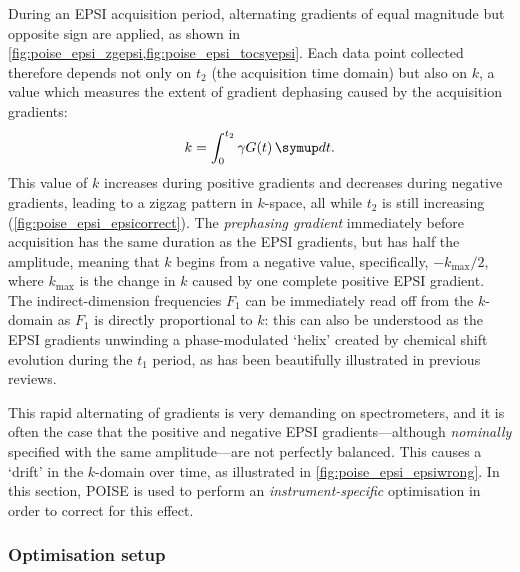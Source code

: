 During an EPSI acquisition period, alternating gradients of equal magnitude but opposite sign are applied, as shown in \cref{fig:poise_epsi_zgepsi,fig:poise_epsi_tocsyepsi}. Each data point collected therefore depends not only on $t_2$ (the acquisition time domain) but also on $k$, a value which measures the extent of gradient dephasing caused by the acquisition gradients:
\begin{equation}
    \label{eq:epsi_k_space}
    k = \int_0^{t_2} \gamma G(t) \,\md t.
\end{equation}
This value of $k$ increases during positive gradients and decreases during negative gradients, leading to a zigzag pattern in $k$-space, all while $t_2$ is still increasing (\cref{fig:poise_epsi_epsicorrect}).
The \textit{prephasing gradient} immediately before acquisition has the same duration as the EPSI gradients, but has half the amplitude, meaning that $k$ begins from a negative value, specifically, $-k_\text{max} / 2$, where $k_\text{max}$ is the change in $k$ caused by one complete positive EPSI gradient.
The indirect-dimension frequencies $F_1$ can be immediately read off from the $k$-domain as $F_1$ is directly proportional to $k$: this can also be understood as the EPSI gradients unwinding a phase-modulated `helix' created by chemical shift evolution during the $t_1$ period, as has been beautifully illustrated in previous reviews.\autocite{Frydman2003JACS,Tal2010PNMRS}

This rapid alternating of gradients is very demanding on spectrometers, and it is often the case that the positive and negative EPSI gradients---although \textit{nominally} specified with the same amplitude---are not perfectly balanced.
This causes a `drift' in the $k$-domain over time, as illustrated in \cref{fig:poise_epsi_epsiwrong}.
In this section, POISE is used to perform an \textit{instrument-specific} optimisation in order to correct for this effect.


\subsubsection{Optimisation setup}

